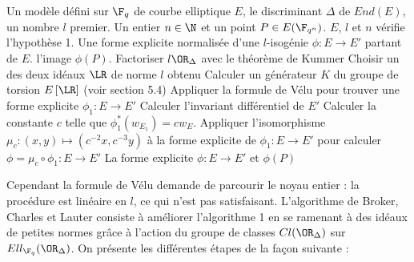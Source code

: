 \begin{algorithm}
	\caption{Calcul d'une forme explicite normalisée de $l$-isogénie}
	\begin{algorithmic}[1]
		\Require Un modèle défini sur $\F_{q}$ de courbe elliptique $E$, le discriminant $\Delta$ de $End(E)$, un nombre $l$ premier. Un entier $n\in\N$ et un point $P\in E(\F_{q^{n}})$. $E$, $l$ et $n$ vérifie l'hypothèse 1. 
		\Ensure Une forme explicite normalisée d'une $l$-isogénie $\phi : E \rightarrow E'$ partant de $E$. l'image $\phi(P)$. 
		\State Factoriser $l\OR_{\Delta}$ avec le théorème de Kummer
		\State Choisir un des deux idéaux $\LR$ de norme $l$ obtenu
		\State Calculer un générateur $K$ du groupe de torsion $E\left[ \LR\right]$ (voir section 5.4)
		\State Appliquer la formule de Vélu pour trouver une forme explicite $\phi_1 : E \rightarrow E'$ 
		\State Calculer l'invariant différentiel de $E'$
		\State Calculer la constante $c$ telle que $\phi_{1}^{*}(w_{E_{1}}) = cw_E$. 
		\State Appliquer l'isomorphisme $\mu_{c} : (x,y) \mapsto (c^{-2}x, c^{-3}y)$ à la forme explicite de $\phi_1 : E\rightarrow E'$ pour calculer $\phi = \mu_{c}\circ\phi_{1} : E \rightarrow E'$
		\State \Return La forme explicite $\phi : E \rightarrow E'$ et $\phi(P)$
	\end{algorithmic}
	
\end{algorithm}


Cependant la formule de Vélu demande de parcourir le noyau entier : la procédure est linéaire en $l$, ce qui n'est pas satisfaisant. L'algorithme de Broker, Charles et Lauter consiste à améliorer l'algorithme 1 en se ramenant à des idéaux de petites normes grâce à l'action du groupe de classes $Cl(\OR_{\Delta})$ sur $Ell_{\F_{q}}(\OR_{\Delta})$. On présente les différentes étapes de la façon suivante :


